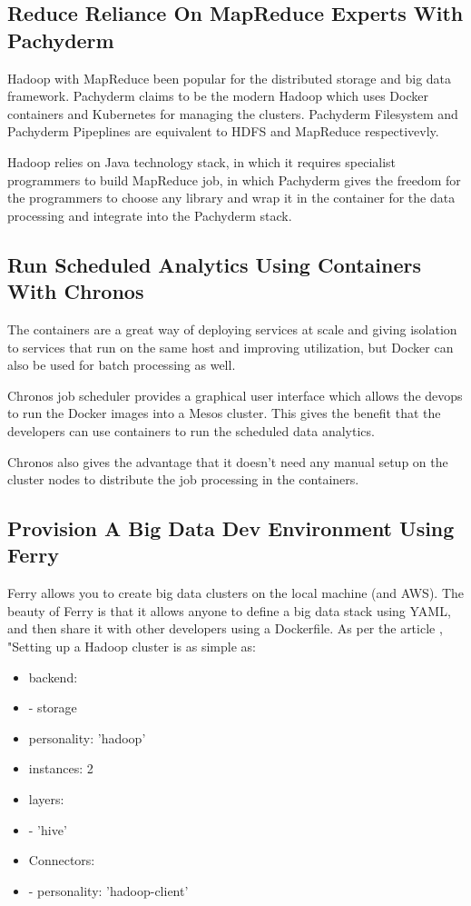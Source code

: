 \documentclass[sigconf]{acmart}
\begin{document}
	\subsection{Reduce Reliance On MapReduce Experts With Pachyderm}
	
	Hadoop with MapReduce been popular for the distributed storage and big data framework. Pachyderm claims to be the modern Hadoop which uses Docker containers and Kubernetes for managing the clusters. Pachyderm Filesystem and Pachyderm Pipeplines are equivalent to HDFS and MapReduce respectivevly.
	
	Hadoop relies on Java technology stack, in which it requires specialist programmers to build MapReduce job, in which Pachyderm gives the freedom for the programmers to choose any library and wrap it in the container for the data processing and integrate into the Pachyderm stack. \cite{pachyderm}
		
	\subsection{Run Scheduled Analytics Using Containers With Chronos}
	The containers are a great way of deploying services at scale and giving isolation to services that run on the same host and improving utilization, but Docker can also be used for batch processing as well.
	
	Chronos job scheduler provides a graphical user interface which allows the devops to run the Docker images into a Mesos cluster. This gives the benefit that the developers can use containers to run the scheduled data analytics.\cite{Chronos}
	
	Chronos also gives the advantage that it doesn't need any manual setup on the cluster nodes to distribute the job processing in the containers.
	
	\subsection{Provision A Big Data Dev Environment Using Ferry}
	Ferry allows you to create big data clusters on the local machine (and AWS). The beauty of Ferry is that it allows anyone to define a big data stack using YAML, and then share it with other developers using a Dockerfile.
	As per the article \cite{Ferry}, "Setting up a Hadoop cluster is as simple as:
	
	
	\begin{itemize}
		\item[]\noindent backend:
		\item[] - storage 
		\item[] personality: 'hadoop'
		\item[] instances: 2
		\item[] layers:
		\item[] - 'hive'
		\item[]\noindent Connectors: 
		\item[] - personality: 'hadoop-client'
	\end{itemize}	
	
\end{document}
